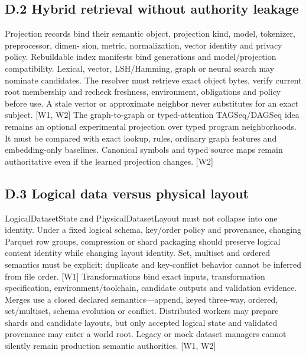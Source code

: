 \documentclass{article}
\begin{document}
\subsection*{D.2 Hybrid retrieval without authority leakage}

Projection records bind their semantic object, projection kind, model, tokenizer, preprocessor, dimen-
sion, metric, normalization, vector identity and privacy policy. Rebuildable index manifests bind
generations and model/projection compatibility. Lexical, vector, LSH/Hamming, graph or neural
search may nominate candidates. The resolver must retrieve exact object bytes, verify current root
membership and recheck freshness, environment, obligations and policy before use. A stale vector or
approximate neighbor never substitutes for an exact subject. [W1, W2]
The graph-to-graph or typed-attention TAGSeq/DAGSeq idea remains an optional experimental
projection over typed program neighborhoods. It must be compared with exact lookup, rules, ordinary
graph features and embedding-only baselines. Canonical symbols and typed source maps remain
authoritative even if the learned projection changes. [W2]

\subsection*{D.3 Logical data versus physical layout}

LogicalDatasetState and PhysicalDatasetLayout must not collapse into one identity. Under a fixed
logical schema, key/order policy and provenance, changing Parquet row groups, compression or
shard packaging should preserve logical content identity while changing layout identity. Set, multiset
and ordered semantics must be explicit; duplicate and key-conflict behavior cannot be inferred from
file order. [W1]
Transformations bind exact inputs, transformation specification, environment/toolchain, candidate
outputs and validation evidence. Merges use a closed declared semantics—append, keyed three-way,
ordered, set/multiset, schema evolution or conflict. Distributed workers may prepare shards and
candidate layouts, but only accepted logical state and validated provenance may enter a world root.
Legacy or mock dataset managers cannot silently remain production semantic authorities. [W1, W2]
\end{document}

